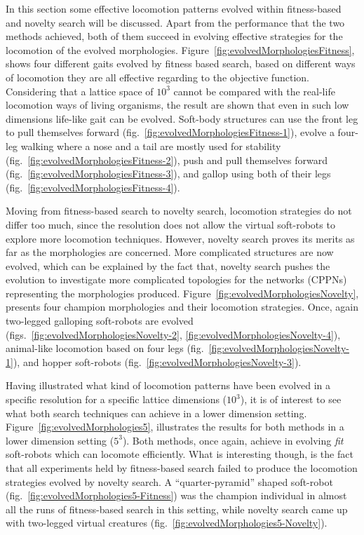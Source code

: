 In this section some effective locomotion patterns evolved within fitness-based and novelty search will be discussed. Apart from the performance that the two methods achieved, both of them succeed in evolving effective strategies for the locomotion of the evolved morphologies. Figure~\ref{fig:evolvedMorphologiesFitness}, shows four different gaits evolved by fitness based search, based on different ways of locomotion they are all effective regarding to the objective function. Considering that a lattice space of $10^3$ cannot be compared with the real-life locomotion ways of living organisms, the result are shown that even in such low dimensions life-like gait can be evolved. Soft-body structures can use the front leg to pull themselves forward (fig.~\ref{fig:evolvedMorphologiesFitness-1}), evolve a four-leg walking where a nose and a tail are mostly used for stability (fig.~\ref{fig:evolvedMorphologiesFitness-2}), push and pull themselves forward (fig.~\ref{fig:evolvedMorphologiesFitness-3}), and gallop using both of their legs (fig.~\ref{fig:evolvedMorphologiesFitness-4}). 

Moving from fitness-based search to novelty search, locomotion strategies do not differ too much, since the resolution does not allow the virtual soft-robots to explore more locomotion techniques. However, novelty search proves its merits as far as the morphologies are concerned. More complicated structures are now evolved, which can be explained by the fact that, novelty search pushes the evolution to investigate more complicated topologies for the networks (CPPNs) representing the morphologies produced. Figure~\ref{fig:evolvedMorphologiesNovelty}, presents four champion morphologies and their locomotion strategies. Once, again two-legged galloping soft-robots are evolved (figs.~\ref{fig:evolvedMorphologiesNovelty-2}, \ref{fig:evolvedMorphologiesNovelty-4}), animal-like locomotion based on four legs (fig.~\ref{fig:evolvedMorphologiesNovelty-1}), and hopper soft-robots (fig.~\ref{fig:evolvedMorphologiesNovelty-3}).

Having illustrated what kind of locomotion patterns have been evolved in a specific resolution for a specific lattice dimensions ($10^3$), it is of interest to see what both search techniques can achieve in a lower dimension setting. Figure~\ref{fig:evolvedMorphologies5}, illustrates the results for both methods in a lower dimension setting ($5^3$). Both methods, once again, achieve in evolving \emph{fit} soft-robots which can locomote efficiently. What is interesting though, is the fact that all experiments held by fitness-based search failed to produce the locomotion strategies evolved by novelty search. A ``quarter-pyramid'' shaped soft-robot (fig.~\ref{fig:evolvedMorphologies5-Fitness}) was the champion individual in almost all the runs of fitness-based search in this setting, while novelty search came up with two-legged virtual creatures (fig.~\ref{fig:evolvedMorphologies5-Novelty}).

